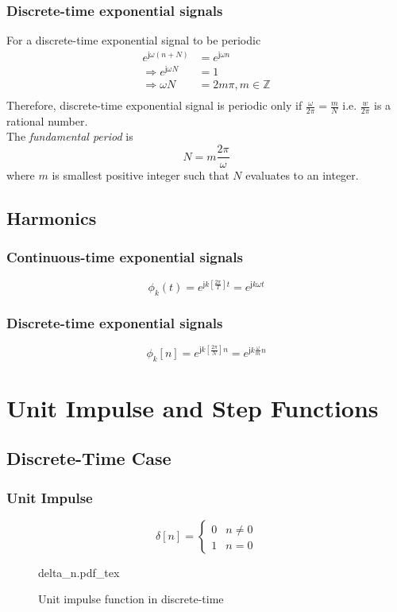 \documentclass[oneside]{book}
\newcommand{\incfig}[1]{%
    {#1.pdf_tex}
}
\begin{document}
\subsubsection{Discrete-time exponential signals}
For a discrete-time exponential signal to be periodic
\begin{align*}
	e^{\mathsf{j}\omega(n + N)}        & = e^{\mathsf{j}\omega n} \\
	\Rightarrow e^{\mathsf{j}\omega N} & = 1                      \\
	\Rightarrow \omega N               & = 2m\pi, m\in\mathbb{Z}  \\
\end{align*}
Therefore, discrete-time exponential signal is periodic only if \(\displaystyle \frac{\omega}{2\pi} = \frac{m}{N}\) i.e. \(\displaystyle\frac{w}{2\pi}\) is a rational number.\\
The \textit{fundamental period} is
\[
	N = m\frac{2\pi}{\omega}
\]
where $m$ is smallest positive integer such that $N$ evaluates to an integer.

\subsection{Harmonics}
\subsubsection{Continuous-time exponential signals}
\[
	\phi_k(t) = e^{\mathsf{j}k[\frac{2\pi}{T}]t} = e^{\mathsf{j}k\omega t}
\]
\subsubsection{Discrete-time exponential signals}
\[
	\phi_k[n] = e^{\mathsf{j}k[\frac{2\pi}{N}]n} = e^{\mathsf{j}k\frac{\omega}{m} n}
\]

\section{Unit Impulse and Step Functions}
\subsection{Discrete-Time Case}
\subsubsection{Unit Impulse}
\[
	\delta[n] = \begin{cases}
		0 & n\neq 0 \\
		1 & n = 0
	\end{cases}
\]
\begin{figure}[ht]
	\centering
	\incfig{delta_n}
	\caption{Unit impulse function in discrete-time}
\end{figure}
\end{document}
